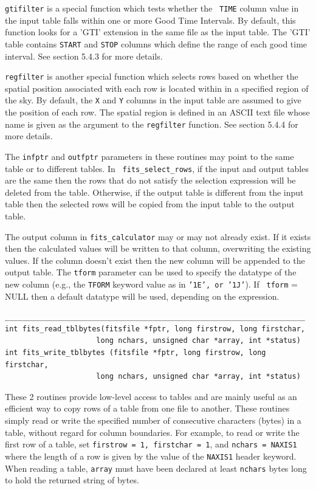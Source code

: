 \documentclass[11pt]{article}
\begin{document}
{\tt gtifilter} is a special function which tests whether the {\tt
TIME} column value in the input table falls within one or more Good
Time Intervals.  By default, this function looks for a 'GTI' extension
in the same file as the input table.  The 'GTI' table contains {\tt START}
and {\tt STOP} columns which define the range of
each good time interval. See section 5.4.3 for more details.

{\tt regfilter} is another special function which selects rows based on
whether the spatial position associated with each row is located within
in a specified region of the sky.  By default, the {\tt X} and {\tt Y}
columns in the input table are assumed to give the position of each row.
The spatial region is defined in an ASCII text file whose name is given
as the argument to the {\tt regfilter} function. See section 5.4.4 for
more details.

The {\tt infptr} and {\tt outfptr} parameters in these routines may
point to the same table or to different tables.  In {\tt
fits\_select\_rows}, if the input and output tables are the same then
the rows that do not satisfy the selection expression will be deleted
from the table.  Otherwise, if the output table is different from the
input table then the selected rows will be copied from the input table
to the output table.

The output column in {\tt fits\_calculator} may or may not already
exist.  If it exists then the calculated values will be written to that
column, overwriting the existing values.  If the column doesn't exist
then the new column will be appended to the output table. The {\tt tform}
parameter can be used to specify the datatype of the new column (e.g.,
the {\tt TFORM} keyword value as in {\tt '1E', or '1J'}). If {\tt
tform} = NULL then a default datatype will be used, depending on the
expression.

\begin{verbatim}
_____________________________________________________________________
int fits_read_tblbytes(fitsfile *fptr, long firstrow, long firstchar,
                     long nchars, unsigned char *array, int *status)
int fits_write_tblbytes (fitsfile *fptr, long firstrow, long firstchar,
                     long nchars, unsigned char *array, int *status)
\end{verbatim}

These 2 routines provide low-level access to tables and are mainly
useful as an efficient way to copy rows of a table from one file to
another.  These routines simply read or write the specified number of
consecutive characters (bytes) in a table, without regard for column
boundaries.  For example, to read or write the first row of a table,
set {\tt firstrow = 1, firstchar = 1}, and {\tt nchars = NAXIS1} where
the length of a row is given by the value of the {\tt NAXIS1} header
keyword.  When reading a table, {\tt array} must have been declared at
least {\tt nchars} bytes long to hold the returned string of bytes.
\end{document}
